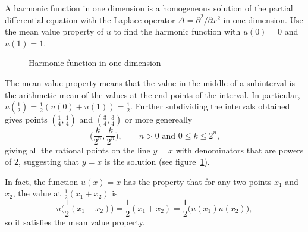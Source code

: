 A harmonic function in one dimension is a homogeneous solution of the
partial differential equation with the Laplace operator
$\Delta = \partial^2/\partial x^2$ in one dimension.
Use the mean value property of $u$ to find the harmonic function
with $u(0)=0$ and $u(1)=1$.

\begin{loesung}
\begin{figure}
\centering
{}
\caption{Harmonic function in one dimension
\label{70000013:fig}}
\end{figure}
The mean value property means that the value in the middle of a
subinterval is the arithmetic mean of the values at the end points
of the interval.
In particular, $u(\frac12)=\frac12(u(0)+u(1)) = \frac12$.
Further subdividing the intervals obtained gives points
$(\frac14,\frac14)$ and
$(\frac34,\frac34)$ or more genereally
\[
\biggl(\frac{k}{2^n},\frac{k}{2^n}\biggr),
\qquad
\text{$n>0$ and $0\le k\le 2^n$,}
\]
giving all the rational points on the line $y=x$ with denominators that
are powers of $2$, suggesting that $y=x$ is the solution
(see figure~\ref{70000013:fig}).

In fact, the function $u(x)=x$ has the property that for any two
points $x_1$ and $x_2$, the value at $\frac12(x_1+x_2)$ is
\[
u\bigl({\textstyle\frac12}(x_1+x_2)\bigr)
=
{\textstyle\frac12}(x_1+x_2)
=
\frac12\bigl(u(x_1) u(x_2)\bigr),
\]
so it satisfies the mean value property.
\end{loesung}

